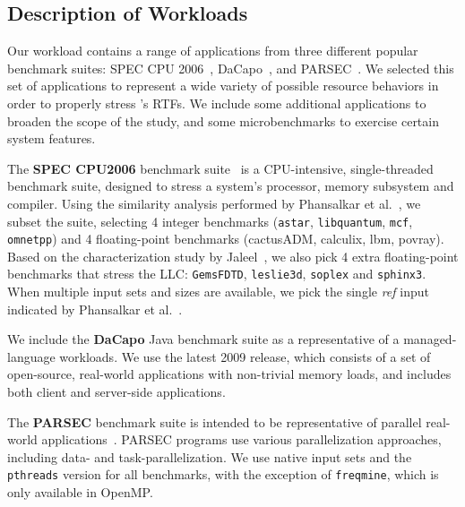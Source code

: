 
\subsection*{Description of Workloads}

Our workload contains a range of applications from three different
popular benchmark suites: SPEC CPU 2006~\cite{SPEC2006},
DaCapo~\cite{dacapo}, and PARSEC~\cite{parsec}. We selected this set of applications to represent a wide variety of possible resource behaviors in order to properly stress \pacora's RTFs. We include some additional applications to broaden the
scope of the study, and some microbenchmarks to exercise certain
system features.

The \textbf{SPEC CPU2006} benchmark suite~\cite{SPEC2006} is a
CPU-intensive, single-threaded benchmark suite, designed to stress a
system's processor, memory subsystem and compiler.  Using the
similarity analysis performed by Phansalkar et
al.~\cite{Phansalkar:ISCA2007}, we subset the suite, selecting 4
integer benchmarks ({\tt astar}, {\tt libquantum}, {\tt mcf}, {\tt omnetpp}) and 4
floating-point benchmarks (cactusADM, calculix, lbm, povray).  Based
on the characterization study by Jaleel~\cite{Jaleel:TR2007}, we also
pick 4 extra floating-point benchmarks that stress the LLC: {\tt GemsFDTD},
{\tt leslie3d}, {\tt soplex} and {\tt sphinx3}.  When multiple input sets and sizes are
available, we pick the single \textit{ref} input indicated by
Phansalkar et al.~\cite{Phansalkar:ISCA2007}.

We include the \textbf{DaCapo} Java benchmark suite as a
representative of a managed-language workloads. We use the latest 2009 release, which consists of a set of open-source, real-world
applications with non-trivial memory loads, and includes both client and
server-side applications.

The \textbf{PARSEC} benchmark suite is intended to be representative
of parallel real-world applications~\cite{parsec}. PARSEC
programs use various parallelization approaches, including data- and
task-parallelization. We use native input sets and the {\tt pthreads} version for all benchmarks, with the exception of
\texttt{freqmine}, which is only available in OpenMP.


